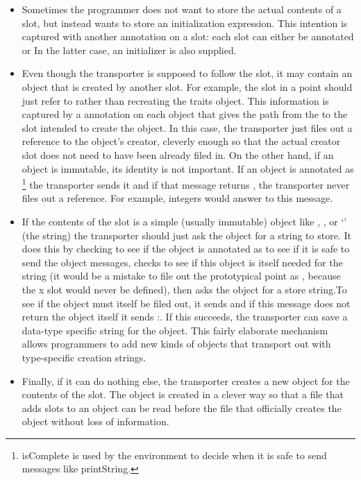 \documentclass[letterpaper,10pt,english]{sphinxmanual}
\begin{document}
\begin{itemize}
\item {} 
Sometimes the programmer does not want to store the actual contents of a slot, but instead
wants to store an initialization expression. This intention is captured with another annotation
on a slot: each slot can either be annotated  or 
In the latter case, an initializer is also supplied.

\item {} 
Even though the transporter is supposed to follow the slot, it may contain an object that is created
by another slot. For example, the  slot in a point should just refer to 
rather than recreating the traits object. This information is captured by a  annotation
on each object that gives the path from the  to the slot intended to create the object.
In this case, the transporter just files out a reference to the object’s creator, cleverly
enough so that the actual creator slot does not need to have been already filed in. On the other
hand, if an object is immutable, its identity is not important. If an object is annotated as
 \footnote{
isComplete is used by the environment to decide when it is safe to send messages like printString.
} the transporter sends it  and if that message returns
, the transporter never files out a reference. For example, integers would answer
 to this message.

\item {} 
If the contents of the slot is a simple (usually immutable) object like , , or ‘’ (the
string) the transporter should just ask the object for a string to store. It does this by checking to
see if the object is annotated as  to see if it is safe to send the object messages,
checks to see if this object is itself needed for the string (it would be a mistake to file out the
prototypical point as , because the x slot would never be defined), then asks the object for a
store string.To see if the object must itself be filed out, it sends  and if
this message does not return the object itself it sends :. If this succeeds,
the transporter can save a data-type specific string for the object. This fairly elaborate mechanism
allows programmers to add new kinds of objects that transport out with type-specific creation
strings.

\item {} 
Finally, if it can do nothing else, the transporter creates a new object for the contents of the
slot. The object is created in a clever way so that a file that adds slots to an object can be read
before the file that officially creates the object without loss of information.

\end{itemize}
\end{document}
